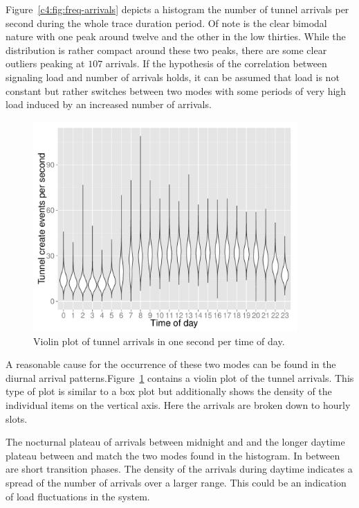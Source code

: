 Figure~\ref{c4:fig:freq-arrivals} depicts a histogram the number of tunnel arrivals per second during the whole trace duration period. Of note is the clear bimodal nature with one peak around twelve and the other in the low thirties. While the distribution is rather compact around these two peaks, there are some clear outliers peaking at $107$ arrivals.
If the hypothesis of the correlation between signaling load and number of arrivals holds, it can be assumed that load is not constant but rather switches between two modes with some periods of very high load induced by an increased number of arrivals.

\begin{figure}[htb]
	\centering
	\includegraphics[width=0.9\textwidth]{images/R-createspersecond-1h-violin.pdf}
	\caption{Violin plot of tunnel arrivals in one second per time of day.}
	\label{c4:fig:freq-arrivals-per-second-violin}
\end{figure}

A reasonable cause for the occurrence of these two modes can be found in the diurnal arrival patterns.Figure~\ref{c4:fig:freq-arrivals-per-second-violin} contains a violin plot of the tunnel arrivals. This type of plot is similar to a box plot but additionally shows the density of the individual items on the vertical axis. Here the arrivals are broken down to hourly slots. 

The nocturnal plateau of arrivals between midnight and  and the longer daytime plateau between  and  match the two modes found in the histogram. In between are short transition phases. The density of the arrivals during daytime indicates a spread of the number of arrivals over a larger range. This could be an indication of load fluctuations in the system.



